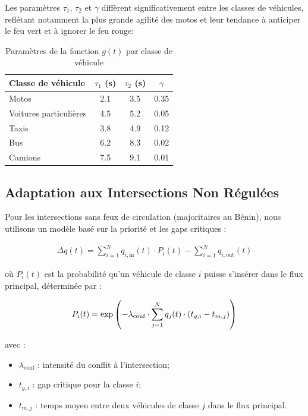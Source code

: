 Les paramètres $\tau_1$, $\tau_2$ et $\gamma$ diffèrent significativement entre les classes de véhicules, reflétant notamment la plus grande agilité des motos et leur tendance à anticiper le feu vert et à ignorer le feu rouge:

\begin{table}[htbp]
\centering
\caption{Paramètres de la fonction $g(t)$ par classe de véhicule}
\label{tab:parametres_g}
\begin{tabular}{lccc}
\toprule
\textbf{Classe de véhicule} & $\tau_1$ (s) & $\tau_2$ (s) & $\gamma$ \\
\midrule
Motos & 2.1 & 3.5 & 0.35 \\
Voitures particulières & 4.5 & 5.2 & 0.05 \\
Taxis & 3.8 & 4.9 & 0.12 \\
Bus & 6.2 & 8.3 & 0.02 \\
Camions & 7.5 & 9.1 & 0.01 \\
\bottomrule
\end{tabular}
\end{table}

\subsection{Adaptation aux Intersections Non Régulées}
\label{subsec:intersections_non_regulees}

Pour les intersections sans feux de circulation (majoritaires au Bénin), nous utilisons un modèle basé sur la priorité et les gaps critiques :

\begin{align}
\Delta q(t) = \sum_{i=1}^N q_{i,\text{in}}(t) \cdot P_i(t) - \sum_{i=1}^N q_{i,\text{out}}(t)
\label{eq:flux_non_regule}
\end{align}

où $P_i(t)$ est la probabilité qu'un véhicule de classe $i$ puisse s'insérer dans le flux principal, déterminée par :

\begin{align}
P_i(t) = \exp\left(-\lambda_{\text{conf}} \cdot \sum_{j=1}^N q_{j}(t) \cdot (t_{g,i} - t_{m,j}) \right)
\label{eq:probabilite_insertion}
\end{align}

avec :
\begin{itemize}
\item $\lambda_{\text{conf}}$ : intensité du conflit à l'intersection;
\item $t_{g,i}$ : gap critique pour la classe $i$;
\item $t_{m,j}$ : temps moyen entre deux véhicules de classe $j$ dans le flux principal.
\end{itemize}

